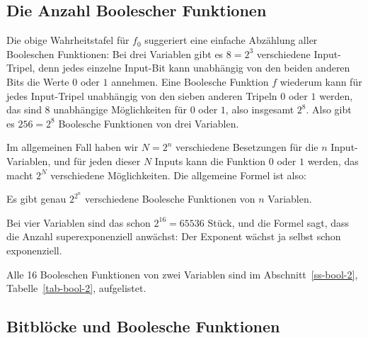 \begin{refsegment}
\subsection{Die Anzahl Boolescher Funktionen}\label{ss-bool-enum}

Die obige Wahrheitstafel für $f_0$ suggeriert eine einfache Abzählung aller
Booleschen Funktionen:
Bei drei Variablen gibt es $8 = 2^3$ verschiedene Input-Tripel, denn jedes
einzelne Input-Bit kann unabhängig von den beiden anderen Bits die Werte $0$ oder $1$
annehmen. Eine Boolesche Funktion $f$ wiederum kann für jedes Input-Tripel
unabhängig von den sieben anderen Tripeln $0$ oder $1$ werden, das
sind $8$ unabhängige Möglichkeiten für $0$ oder $1$, also insgesamt $2^8$.
Also gibt es $256 = 2^8$ Boolesche Funktionen von drei Variablen.

Im allgemeinen Fall haben wir $N = 2^n$ verschiedene Besetzungen für
die $n$ Input-Variablen, und für jeden dieser $N$ Inputs kann die
Funktion $0$ oder $1$ werden, das macht $2^N$ verschiedene
Möglichkeiten. Die allgemeine Formel ist also:

\begin{satz}\label{thm-bool-enum}
   Es gibt genau $2^{2^n}$ verschiedene Boolesche Funktionen von
   $n$ Variablen.
\end{satz}

Bei vier Variablen sind das schon $2^{16} = 65536$ Stück, und die Formel
sagt, dass die Anzahl superexponenziell anwächst: Der Exponent wächst
ja selbst schon exponenziell.

Alle 16 Booleschen Funktionen von zwei Variablen sind im
Abschnitt~\ref{ss-bool-2}, Tabelle~\ref{tab-bool-2}, aufgelistet.

\subsection{Bitblöcke und Boolesche Funktionen}\label{ss-bool-blck}


\end{refsegment}
